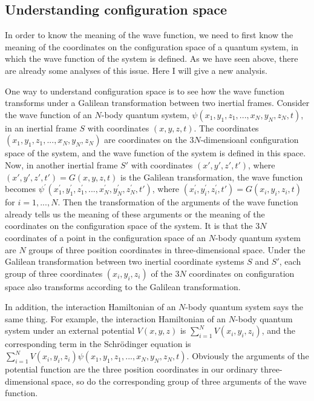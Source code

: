 \subsection{Understanding configuration space}

In order to know the meaning of the wave function, we need to first know the meaning of the coordinates on the configuration space of a quantum system, in which the wave function of the system is defined. 
As we have seen above, there are already some analyses of this issue. Here I will give a new analysis.

One way to understand configuration space is to see how the wave function transforms under a Galilean transformation between two inertial frames. Consider the wave function of an $N$-body quantum system, $\psi(x_1,y_1,z_1, ..., x_N,y_N,z_N,t)$, in an inertial frame $S$ with coordinates $(x,y,z,t)$. The coordinates $(x_1,y_1,z_1, ..., x_N,y_N,z_N)$ are coordinates on the $3N$-dimensioanl configuration space of the system, and the wave function of the system is defined in this space. Now, in another inertial frame $S'$ with coordinates $(x',y',z',t')$, where $(x',y',z',t')=G(x,y,z,t)$ is the Galilean transformation, the wave function becomes $\psi^{'}(x_1^{'},y_1^{'},z_1^{'}, ..., x_N^{'},y_N^{'},z_N^{'},t')$, where $(x_i^{'},y_i^{'},z_i^{'},t')=G(x_i,y_i,z_i,t)$ for $i=1, ..., N$. Then the transformation of the arguments of the wave function already tells us the meaning of these arguments or the meaning of the coordinates on the configuration space of the system. It is that the $3N$ coordinates of a point in the configuration space of an $N$-body quantum system are $N$ groups of three position coordinates in three-dimensional space. Under the Galilean transformation between two inertial coordinate systems $S$ and $S'$, each group of three coordinates $(x_i, y_i, z_i)$ of the $3N$ coordinates on configuration space also transforms according to the Galilean transformation.

In addition, the interaction Hamiltonian of an $N$-body quantum system says the same thing. For example,
the interaction Hamiltonian of an $N$-body quantum system under an external potential $V(x,y,z)$ is $\sum_{i=1}^N{V(x_i, y_i, z_i)}$, and the corresponding term in the Schr\"{o}dinger equation is $\sum_{i=1}^N{V(x_i, y_i, z_i)}\psi(x_1,y_1,z_1, ..., x_N,y_N,z_N,t)$. Obviously the arguments of the potential function are the three position coordinates in our ordinary three-dimensional space, so do the corresponding group of three arguments of the wave function. 


